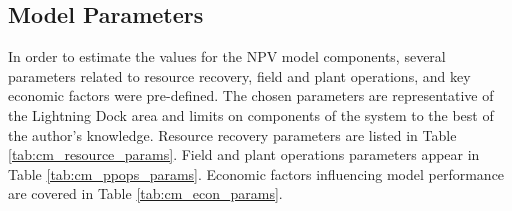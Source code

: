 \subsection{Model Parameters}
In order to estimate the values for the NPV model components, several parameters related to resource recovery, field and plant operations, and key economic factors were pre-defined. The chosen parameters are representative of the Lightning Dock area and limits on components of the system to the best of the author's knowledge. Resource recovery parameters are listed in Table \ref{tab:cm_resource_params}. Field and plant operations parameters appear in Table \ref{tab:cm_ppops_params}. Economic factors influencing model performance are covered in Table \ref{tab:cm_econ_params}.

\begin{table}[!htp]
\centering
{}
\caption[Cost model parameters for resource recovery]{Parameters related to resource recovery in the cost model}
\label{tab:cm_resource_params}
\end{table}

\begin{table}[!htp]
\centering
{}
\caption[Cost model parameters for operations]{Parameters related to field and plant operations in the cost model}
\label{tab:cm_ppops_params}
\end{table}

